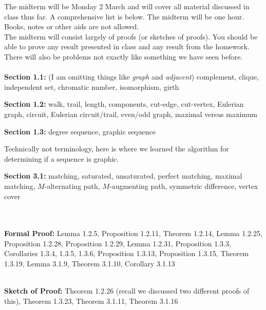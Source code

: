 \documentclass{amsart}
\begin{document}
\thispagestyle{fancy}
The midterm will be Monday 2 March and will cover all material discussed in class thus far. A comprehensive list is below. The midterm will be one hour. Books, notes or other aids are not allowed.\\

The midterm will consist largely of proofs (or sketches of proofs). You should be able to prove any result presented in class and any result from the homework. There will also be problems not exactly like something we have seen before. \\

\\


\noindent\textbf{Section 1.1:} (I am omitting things like \emph{graph} and \emph{adjacent}) complement, clique, independent set, chromatic number, isomorphism, girth

\noindent\textbf{Section 1.2:} walk, trail, length, components, cut-edge, cut-vertex, Eulerian graph, circuit, Eulerian circuit/trail, even/odd graph, maximal versus maximum

\noindent\textbf{Section 1.3:} degree sequence, graphic sequence

Technically not terminology, here is where we learned the algorithm for determining if a sequence is graphic.

\noindent\textbf{Section 3.1:} matching, saturated, unsaturated, perfect matching, maximal matching, $M$-alternating path, $M$-augmenting path, symmetric difference, vertex cover


\quad \\
{}\\

\noindent\textbf{Formal Proof:} Lemma 1.2.5, Proposition 1.2.11, Theorem 1.2.14, Lemma 1.2.25, Proposition 1.2.28, Proposition 1.2.29, Lemma 1.2.31, Proposition 1.3.3, Corollaries 1.3.4, 1.3.5, 1.3.6, Proposition 1.3.13, Proposition 1.3.15, Theorem 1.3.19, Lemma 3.1.9, Theorem 3.1.10, Corollary 3.1.13

\quad \\
\noindent\textbf{Sketch of Proof:} Theorem 1.2.26 (recall we discussed two different proofs of this), Theorem 1.3.23, Theorem 3.1.11, Theorem 3.1.16
\end{document}
